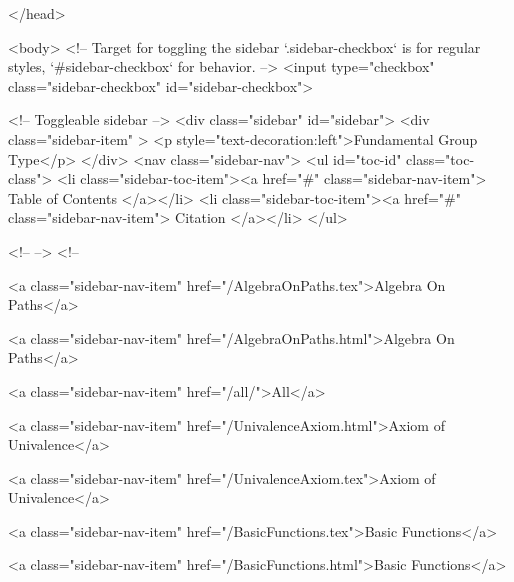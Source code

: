   
</head>




  <body>
    <!-- Target for toggling the sidebar `.sidebar-checkbox` is for regular
     styles, `#sidebar-checkbox` for behavior. -->
<input type="checkbox" class="sidebar-checkbox" id="sidebar-checkbox">

<!-- Toggleable sidebar -->
<div class="sidebar" id="sidebar">
  <div class="sidebar-item" >
    <p style="text-decoration:left">Fundamental Group Type</p>
  </div>
  <nav class="sidebar-nav">
    <ul id="toc-id" class="toc-class">
  <li class="sidebar-toc-item"><a href="#" class="sidebar-nav-item"> Table of Contents </a></li>
  <li class="sidebar-toc-item"><a href="#" class="sidebar-nav-item"> Citation </a></li>
</ul>


    <!--  -->
    <!-- 
      
    
      
    
      
    
      
        
      
    
      
        
          <a class="sidebar-nav-item" href="/AlgebraOnPaths.tex">Algebra On Paths</a>
        
      
    
      
        
          <a class="sidebar-nav-item" href="/AlgebraOnPaths.html">Algebra On Paths</a>
        
      
    
      
        
          <a class="sidebar-nav-item" href="/all/">All</a>
        
      
    
      
        
          <a class="sidebar-nav-item" href="/UnivalenceAxiom.html">Axiom of Univalence</a>
        
      
    
      
        
          <a class="sidebar-nav-item" href="/UnivalenceAxiom.tex">Axiom of Univalence</a>
        
      
    
      
        
          <a class="sidebar-nav-item" href="/BasicFunctions.tex">Basic Functions</a>
        
      
    
      
        
          <a class="sidebar-nav-item" href="/BasicFunctions.html">Basic Functions</a>
        
